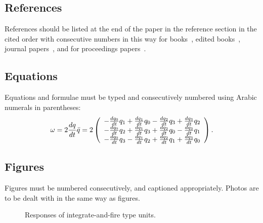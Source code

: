 \documentclass{arsubmit}
\begin{document}
\subsection{References}
\label{sec:References}
References should be listed at the end of the paper in the reference
section in the cited order with consecutive numbers in this way
for books~\cite{AmariNagaoka}, edited books~\cite{PDP}, 
journal papers~\cite{Amari}, and for proceedings 
papers~\cite{IROS}.

\subsection{Equations}
\label{sec:Equations}
Equations and formulae must be typed and consecutively numbered 
using Arabic numerals in parentheses:
\begin{equation}
  \label{eq:quaternion}
  \omega = 2\frac{dq}{dt}\bar q = 2 \left (
  \begin{array}[c]{c}
-\frac{dq_0}{dt}q_1 +\frac{dq_1}{dt}q_0 -\frac{dq_2}{dt}q_3 +\frac{dq_3}{dt}q_2\\
-\frac{dq_0}{dt}q_2 +\frac{dq_1}{dt}q_3 +\frac{dq_2}{dt}q_0 -\frac{dq_3}{dt}q_1\\
-\frac{dq_0}{dt}q_3 -\frac{dq_1}{dt}q_2 +\frac{dq_2}{dt}q_1 +\frac{dq_3}{dt}q_0
  \end{array}\right ).
\end{equation}

\subsection{Figures}
Figures must be numbered consecutively, and captioned appropriately.
Photos are to be dealt with in the same way as figures.
\label{sec:Figures}
\begin{figure}[htbp]
  \begin{center}
    \caption{Responses of integrate-and-fire type units.}
    \label{fig:evolution}
  \end{center}
\end{figure}
\end{document}
